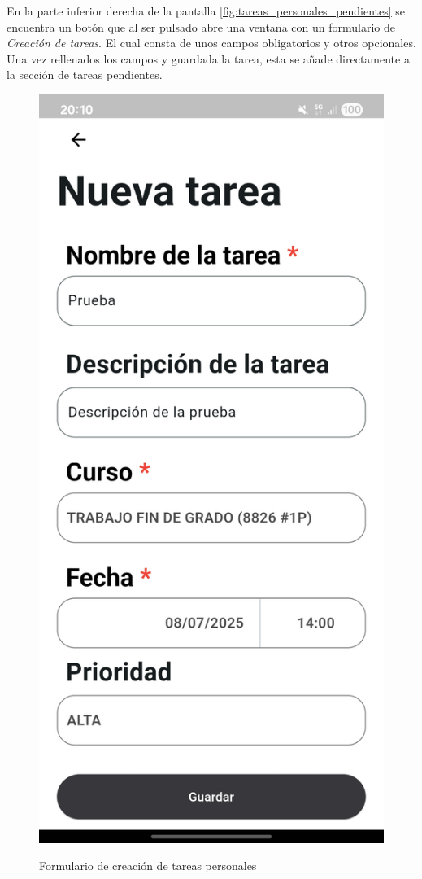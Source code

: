 En la parte inferior derecha de la pantalla \ref{fig:tareas_personales_pendientes} se encuentra un botón que al ser pulsado abre una ventana con un formulario de \textit{Creación de tareas}. El cual consta de unos campos obligatorios y otros opcionales. Una vez rellenados los campos y guardada la tarea, esta se añade directamente a la sección de tareas pendientes.
\begin{figure}[H]
  \centering
  \begin{floatrow}
    \ffigbox
      {\includegraphics[width=0.5\linewidth]{img/formulario_rellenado.jpg}}
      {\caption{Formulario de creación de tareas personales}
      \label{fig:formulario_rellenado}}
    \hfill
    \ffigbox

\end{floatrow}
\end{figure}
